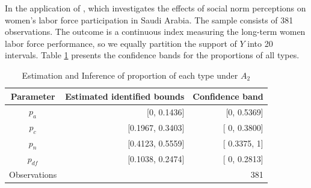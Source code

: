 \documentclass[12pt]{article}
\theoremstyle{plain}
\theoremstyle{definition}
\theoremstyle{remark}
\begin{document}
In the application of \cite{bursztyn2020misperceived}, which investigates the effects of social norm perceptions on women's labor force participation in Saudi Arabia. The sample consists of 381 observations. The outcome is a continuous index measuring the long-term women labor force performance, so we equally partition the support of $Y$ into 20 intervals. Table \ref{tab:inf_type_prop_no_mon} presents the confidence bands for the proportions of all types.

\begin{table}
    \centering
    \caption{Estimation and Inference of proportion of each type under $A_2$}
      \begin{tabular}{crr}
      \toprule
      \multicolumn{1}{c}{Parameter} & \multicolumn{1}{c}{Estimated identified bounds} & \multicolumn{1}{c}{Confidence band} \\
      \midrule
      $p_a$ & [0, 0.1436] &  [0,  0.5369] \\
      $p_c$ & [0.1967, 0.3403] & [ 0,  0.3800] \\
      $p_n$ & [0.4123, 0.5559] & [ 0.3375,  1] \\ 
       $p_{df}$    & [0.1038, 0.2474] & [ 0,  0.2813]\\
      Observations & & 381 \\
      \bottomrule
      \end{tabular}%
    \label{tab:inf_type_prop_no_mon}%
\end{table}%
\end{document}
